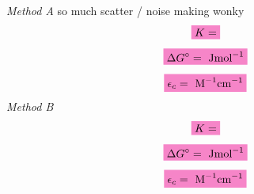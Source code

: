 \noindent \textit{Method A}
so much scatter / noise making wonky
\begin{equation*}
    \mathcolorbox{Lavender}{K = }
\end{equation*}
\begin{equation*}
    \mathcolorbox{Lavender}{\Delta G^{\circ} =  \text{ Jmol}^{-1}}
\end{equation*}
\begin{equation*}
    \mathcolorbox{Lavender}{\epsilon_c = \text{ M}^{-1}\text{cm} ^ {-1}}
\end{equation*}
\textit{Method B}
\begin{equation*}
    \mathcolorbox{Lavender}{K = }
\end{equation*}
\begin{equation*}
    \mathcolorbox{Lavender}{\Delta G^{\circ} =  \text{ Jmol}^{-1}}
\end{equation*}
\begin{equation*}
    \mathcolorbox{Lavender}{\epsilon_c = \text{ M}^{-1}\text{cm} ^ {-1}}
\end{equation*}